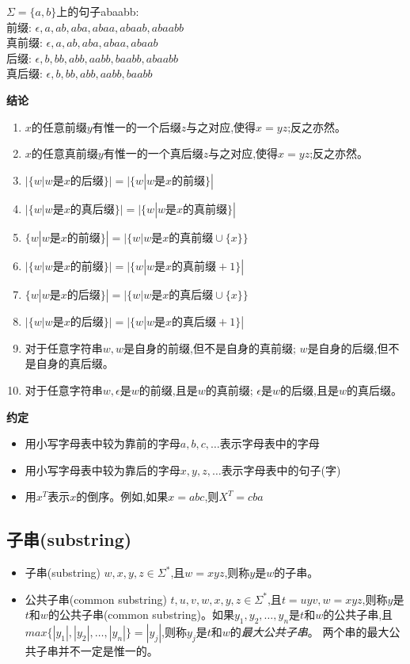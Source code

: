 \begin{example}
	$\Sigma = \{a,b\}$上的句子abaabb:\\
	前缀: $\epsilon,a,ab,aba,abaa,abaab,abaabb$ \\
	真前缀: $\epsilon,a,ab,aba,abaa,abaab$ \\
	后缀: $\epsilon,b,bb,abb,aabb,baabb,abaabb$ \\
	真后缀: $\epsilon,b,bb,abb,aabb,baabb$
\end{example}

\noindent \textbf{结论}

\begin{enumerate}
	\item $x$的任意前缀$y$有惟一的一个后缀$z$与之对应,使得$x=yz$;反之亦然。
	\item $x$的任意真前缀$y$有惟一的一个真后缀$z$与之对应,使得$x=yz$;反之亦然。
	\item $|\{w|w\text{是}x\text{的后缀}\}| = |\{w|w\text{是}x\text{的前缀}\}|$
	\item $|\{w|w\text{是}x\text{的真后缀}\}| = |\{w|w\text{是}x\text{的真前缀}\}|$
	\item $\{w|w\text{是}x\text{的前缀}\}| = |\{w|w\text{是}x\text{的真前缀}\cup \{x\}\}$
	\item $|\{w|w\text{是}x\text{的前缀}\}| = |\{w|w\text{是}x\text{的真前缀} + 1\}|$
	\item $\{w|w\text{是}x\text{的后缀}\}| = |\{w|w\text{是}x\text{的真后缀}\cup \{x\}\}$
	\item $|\{w|w\text{是}x\text{的后缀}\}| = |\{w|w\text{是}x\text{的真后缀} + 1\}|$
	\item 对于任意字符串$w,w$是自身的前缀,但不是自身的真前缀; $w$是自身的后缀,但不是自身的真后缀。
	\item 对于任意字符串$w,\epsilon$是$w$的前缀,且是$w$的真前缀; $\epsilon$是$w$的后缀,且是$w$的真后缀。
\end{enumerate}

\noindent \textbf{约定}
\begin{itemize}
	\item 用小写字母表中较为靠前的字母$a,b,c,\dots$表示字母表中的字母
	\item 用小写字母表中较为靠后的字母$x,y,z,\dots$表示字母表中的句子(字)
	\item 用$x^T$表示$x$的倒序。例如,如果$x=abc$,则$X^T=cba$
\end{itemize}

\subsection{子串(substring)}
\begin{itemize}
	\item 子串(substring)
		\subitem{-} $w,x,y,z\in \Sigma^{\ast}$,且$w=xyz$,则称$y$是$w$的子串。
	\item 公共子串(common substring)
		\subitem{-} $t,u,v,w,x,y,z\in \Sigma^{\ast}$,且$t=uyv,w=xyz$,则称$y$是$t$和$w$的公共子串(common substring)。如果$y_1,y_2,\dots,y_n$是$t$和$w$的公共子串,且$max\{|y_1|,|y_2|,\dots,|y_n|\}=|y_j|$,则称$y_j$是$t$和$w$的\emph{最大公共子串}。
		\subitem{-} 两个串的最大公共子串并不一定是惟一的。
\end{itemize}

